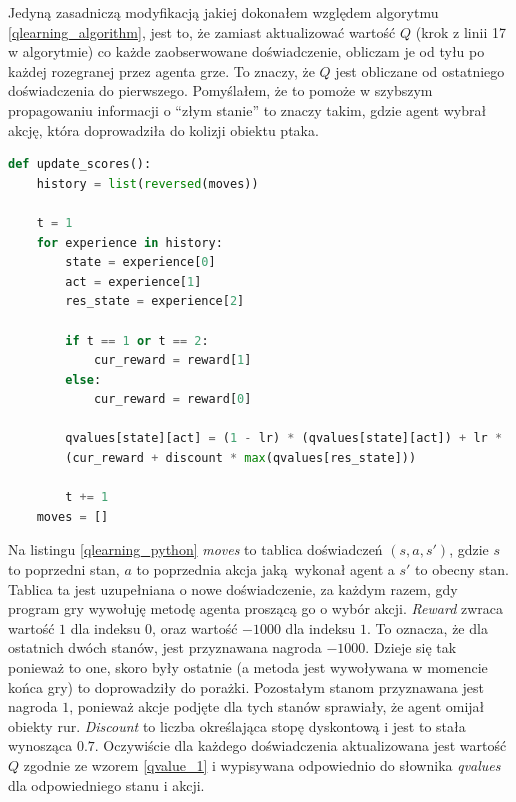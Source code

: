 \documentclass[a4paper, 12pt,twoside]{report}
\begin{document}
Jedyną zasadniczą modyfikacją jakiej dokonałem względem algorytmu
\ref{qlearning_algorithm}, jest to, że zamiast aktualizować wartość $Q$ (krok z
linii 17 w algorytmie) co każde zaobserwowane doświadczenie, obliczam je od
tyłu po każdej rozegranej przez agenta grze. To znaczy, że $Q$ jest obliczane
od ostatniego doświadczenia do pierwszego. Pomyślałem, że to pomoże w szybszym
propagowaniu informacji o ``złym stanie'' to znaczy takim, gdzie agent wybrał
akcję, która doprowadziła do kolizji obiektu ptaka. 
\begin{lstlisting}[language=Python, label={qlearning_python},
caption={Zaimplementowany algorytm Q-Learning.}, captionpos=t]
def update_scores():
    history = list(reversed(moves))

    t = 1
    for experience in history:
        state = experience[0]
        act = experience[1]
        res_state = experience[2]

        if t == 1 or t == 2:
            cur_reward = reward[1]
        else:
            cur_reward = reward[0]

        qvalues[state][act] = (1 - lr) * (qvalues[state][act]) + lr *
	    (cur_reward + discount * max(qvalues[res_state]))

        t += 1
    moves = []
\end{lstlisting}
Na listingu \ref{qlearning_python} \textit{moves} to tablica doświadczeń
$(s, a, s')$, gdzie $s$ to poprzedni
stan, $a$ to poprzednia akcja jaką wykonał agent a $s'$ to obecny stan. Tablica
ta jest uzupełniana o nowe doświadczenie, za każdym razem, gdy program gry 
wywołuję metodę agenta proszącą go o wybór akcji. \textit{Reward} zwraca
wartość $1$ dla indeksu $0$, oraz wartość $-1000$ dla indeksu $1$. To oznacza,
że dla ostatnich dwóch stanów, jest przyznawana nagroda $-1000$. Dzieje się tak
ponieważ to one, skoro były ostatnie (a metoda jest wywoływana w momencie końca
gry) to doprowadziły do porażki. Pozostałym stanom przyznawana jest nagroda
$1$, ponieważ akcje podjęte dla tych stanów sprawiały, że agent omijał obiekty
rur. \textit{Discount} to liczba określająca stopę dyskontową i jest to
stała wynosząca $0.7$. Oczywiście dla każdego doświadczenia aktualizowana jest
wartość $Q$ zgodnie ze wzorem \ref{qvalue_1} i wypisywana odpowiednio do
słownika \textit{qvalues} dla odpowiedniego stanu i akcji. 
\end{document}
